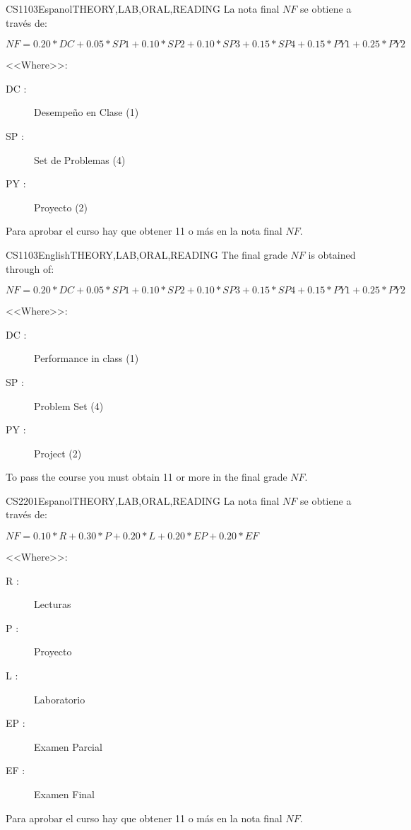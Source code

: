 \begin{evaluation}{CS1103}{Espanol}{THEORY,LAB,ORAL,READING}
La nota final $NF$ se obtiene a través de:

  $ NF = 0.20*DC + 0.05*SP1 + 0.10*SP2 + 0.10*SP3 + 0.15*SP4 +0.15*PY1
   + 0.25*PY2 $

<<Where>>:
  \begin{description}
		\item[DC :] Desempeño en Clase (1)
    \item[SP :] Set de Problemas (4)
    \item[PY :] Proyecto (2)
	\end{description}

	Para aprobar el curso hay que obtener 11 o más en la nota final $NF$.
\end{evaluation}

\begin{evaluation}{CS1103}{English}{THEORY,LAB,ORAL,READING}
The final grade $NF$ is obtained through of:

$ NF = 0.20*DC + 0.05*SP1 + 0.10*SP2 + 0.10*SP3 + 0.15*SP4 +0.15*PY1
 + 0.25*PY2 $

<<Where>>:
\begin{description}
  \item[DC :] Performance in class (1)
  \item[SP :] Problem Set (4)
  \item[PY :] Project (2)
\end{description}

	To pass the course you must obtain 11 or more in the final grade $NF$.
\end{evaluation}

\begin{evaluation}{CS2201}{Espanol}{THEORY,LAB,ORAL,READING}
La nota final $NF$ se obtiene a través de:

  $ NF =  0.10*R + 0.30*P + 0.20*L + 0.20*EP + 0.20*EF $

<<Where>>:
\begin{description}
    \item[R :] Lecturas
    \item[P :] Proyecto
    \item[L :] Laboratorio
    \item[EP :] Examen Parcial
    \item[EF :] Examen Final
\end{description}

	Para aprobar el curso hay que obtener 11 o más en la nota final $NF$.
\end{evaluation}

